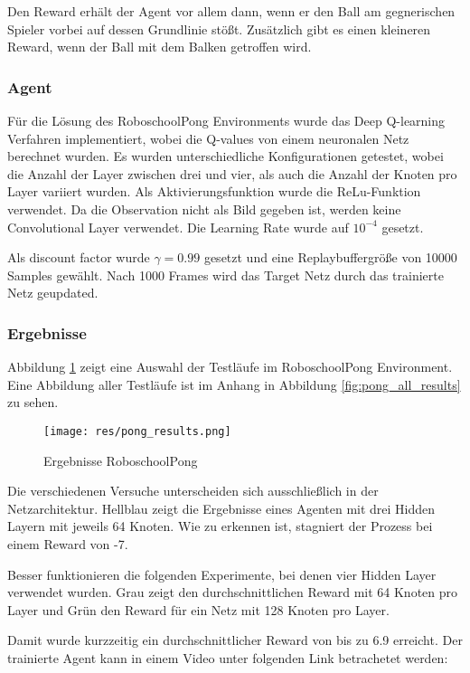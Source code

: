 \documentclass[11pt]{scrartcl}
\begin{document}
Den Reward erhält der Agent vor allem dann, wenn er den Ball am gegnerischen Spieler vorbei
auf dessen Grundlinie stößt. Zusätzlich gibt es einen kleineren Reward, wenn der Ball mit
dem Balken getroffen wird.

\subsubsection{Agent}
Für die Lösung des RoboschoolPong Environments wurde das Deep Q-learning Verfahren implementiert,
wobei die Q-values von einem neuronalen Netz berechnet wurden. Es wurden unterschiedliche
Konfigurationen getestet, wobei die Anzahl der Layer zwischen drei und vier, als auch die
Anzahl der Knoten pro Layer variiert wurden. Als Aktivierungsfunktion wurde die
ReLu-Funktion verwendet. Da die Observation nicht als Bild gegeben ist, werden keine
Convolutional Layer verwendet. Die Learning Rate wurde auf $10^{-4}$ gesetzt.

Als discount factor wurde $\gamma = 0.99$ gesetzt und eine Replaybuffergröße von 10000
Samples gewählt. Nach 1000 Frames wird das Target Netz durch das trainierte Netz geupdated.

\subsubsection{Ergebnisse}
Abbildung \ref{fig:pong_results} zeigt eine Auswahl der Testläufe im RoboschoolPong Environment.
Eine Abbildung aller Testläufe ist im Anhang in Abbildung \ref{fig:pong_all_results} zu
sehen.

\begin{figure}[htp]
\centering
\texttt{[image: res/pong\_results.png]}
\caption{Ergebnisse RoboschoolPong}
\label{fig:pong_results}
\end{figure}
\noindent
Die verschiedenen Versuche unterscheiden sich ausschließlich in der Netzarchitektur. Hellblau zeigt
die Ergebnisse eines Agenten mit drei Hidden Layern mit jeweils 64 Knoten. Wie zu erkennen ist,
stagniert der Prozess bei einem Reward von -7.

Besser funktionieren die folgenden Experimente, bei denen vier Hidden Layer verwendet wurden.
Grau zeigt den durchschnittlichen Reward mit 64 Knoten pro Layer und Grün den Reward für
ein Netz mit 128 Knoten pro Layer.

Damit wurde kurzzeitig ein durchschnittlicher Reward von bis zu 6.9 erreicht. Der
trainierte Agent kann in einem Video unter folgenden Link betrachetet werden:
\end{document}
